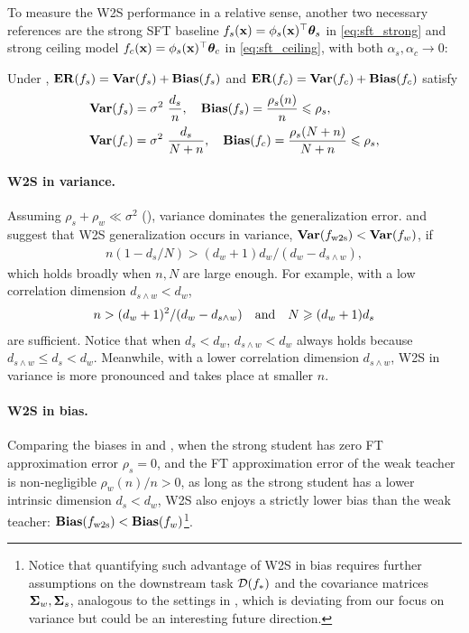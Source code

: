 To measure the W2S performance in a relative sense, another two necessary references are the strong SFT baseline $f_s(\mathbf{x}) = \phi_s(\mathbf{x})^\top \boldsymbol{\theta}_s$ in \eqref{eq:sft_strong} and strong ceiling model $f_c(\mathbf{x}) = \phi_s(\mathbf{x})^\top \boldsymbol{\theta}_c$ in \eqref{eq:sft_ceiling}, with both $\alpha_s, \alpha_c \to 0$:
\begin{corollary}\label{cor:sft_strong}
    Under , $\mathbf{ER}(f_s) = \mathbf{Var}(f_s) + \mathbf{Bias}(f_s)$ and $\mathbf{ER}(f_c) = \mathbf{Var}(f_c) + \mathbf{Bias}(f_c)$ satisfy
    \begin{align*}
    \begin{split}
        & \mathbf{Var}(f_s) = \sigma^2\ \frac{d_s}{n}, \quad 
        \mathbf{Bias}(f_s) = \frac{\rho_s(n)}{n} \leqslant \rho_s, \\
        &\mathbf{Var}(f_c) = \sigma^2\ \frac{d_s}{N+n}, \quad
        \mathbf{Bias}(f_c) = \frac{\rho_s(N+n)}{N+n} \leqslant \rho_s,
    \end{split}
    \end{align*}
\end{corollary}

\paragraph{W2S in variance.}
Assuming $\rho_s + \rho_w \ll \sigma^2$ (), variance dominates the generalization error. 
 and  suggest that W2S generalization occurs in variance, \ie $\mathbf{Var}(f_{\mathrm{w2s}}) < \mathbf{Var}(f_w)$, if
\begin{align*}
    n (1 - d_s / N) > (d_w + 1) d_w / (d_w - d_{s \wedge w}),
\end{align*}
which holds broadly when $n, N$ are large enough. For example, with a low correlation dimension $d_{s \wedge w} < d_w$, 
\begin{align*}
    n > (d_w + 1)^2 / (d_w - d_{s \wedge w}) \quad\text{and}\quad N \geqslant (d_w + 1) d_s
\end{align*}
are sufficient.
Notice that when $d_s < d_w$, $d_{s \wedge w} < d_w$ always holds because $d_{s \wedge w} \le d_s < d_w$.
Meanwhile, with a lower correlation dimension $d_{s \wedge w}$, W2S in variance is more pronounced and takes place at smaller $n$.

\paragraph{W2S in bias.}
Comparing the biases in  and , when the strong student has zero FT approximation error $\rho_s = 0$, and the FT approximation error of the weak teacher is non-negligible ${\rho_w(n)}/{n} > 0$, as long as the strong student has a lower intrinsic dimension $d_s < d_w$, W2S also enjoys a strictly lower bias than the weak teacher: $\mathbf{Bias}(f_{\mathrm{w2s}}) < \mathbf{Bias}(f_w)$\footnote{\label{fn:bias_strong}
    Notice that quantifying such advantage of W2S in bias requires further assumptions on the downstream task $\mathcal{D}(f_*)$ and the covariance matrices $\boldsymbol{\Sigma}_w, \boldsymbol{\Sigma}_s$, analogous to the settings in \cite{ildiz2024high,wu2024provable}, which is deviating from our focus on variance but could be an interesting future direction.
}.



